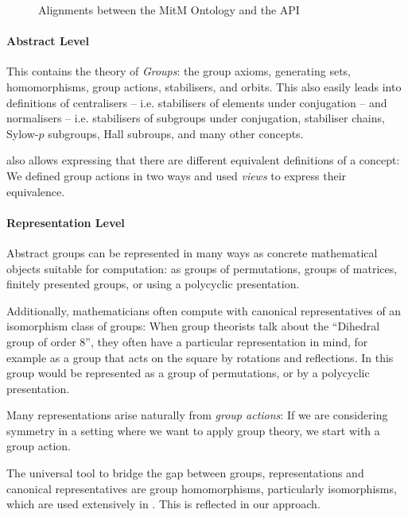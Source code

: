 \begin{figure}[ht]\centering
  \caption{Alignments between the MitM Ontology and the \GAP API}\label{fig:cgtontology}
\end{figure}

\paragraph{Abstract Level} This contains the theory of \emph{Groups}: the group axioms, generating sets, homomorphisms, group actions, stabilisers, and orbits.  
This also easily leads into definitions of centralisers -- i.e. stabilisers of elements under conjugation -- and normalisers -- i.e. stabilisers of subgroups under conjugation, stabiliser chains, Sylow-$p$ subgroups, Hall subroups, and many other concepts.

\OMMT also allows expressing that there are different equivalent definitions of a concept: We defined group actions in two ways and used \emph{views} to express their equivalence.

\paragraph{Representation Level} 
Abstract groups can be represented in many ways as concrete mathematical
objects suitable for computation: as groups of permutations, groups of matrices,
finitely presented groups, or using a polycyclic presentation.

Additionally, mathematicians often compute with canonical representatives of an isomorphism class of groups: When group theorists talk about the ``Dihedral group of order 8'', they often have a particular representation in mind, for example as a group that acts on the square by rotations and reflections. 
In \GAP this group would be represented as a group of permutations, or by a polycyclic presentation.

Many representations arise naturally from \emph{group actions}: If we are
considering symmetry in a setting where we want to apply group theory, we start
with a group action.

The universal tool to bridge the gap between groups, representations and
canonical representatives are group homomorphisms, particularly isomorphisms,
which are used extensively in \GAP. This is reflected in our approach.

